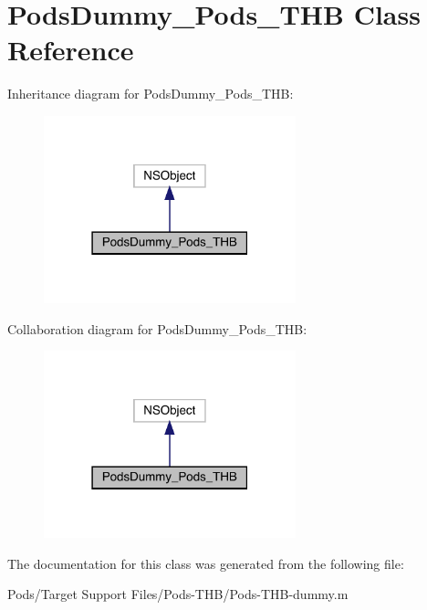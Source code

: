 \hypertarget{interface_pods_dummy___pods___t_h_b}{}\section{Pods\+Dummy\+\_\+\+Pods\+\_\+\+T\+HB Class Reference}
\label{interface_pods_dummy___pods___t_h_b}


Inheritance diagram for Pods\+Dummy\+\_\+\+Pods\+\_\+\+T\+HB\+:\nopagebreak
\begin{figure}[H]
\begin{center}
\leavevmode
\includegraphics[width=207pt]{interface_pods_dummy___pods___t_h_b__inherit__graph}
\end{center}
\end{figure}


Collaboration diagram for Pods\+Dummy\+\_\+\+Pods\+\_\+\+T\+HB\+:\nopagebreak
\begin{figure}[H]
\begin{center}
\leavevmode
\includegraphics[width=207pt]{interface_pods_dummy___pods___t_h_b__coll__graph}
\end{center}
\end{figure}


The documentation for this class was generated from the following file\+:\begin{DoxyCompactItemize}
\item 
Pods/\+Target Support Files/\+Pods-\/\+T\+H\+B/Pods-\/\+T\+H\+B-\/dummy.\+m\end{DoxyCompactItemize}
